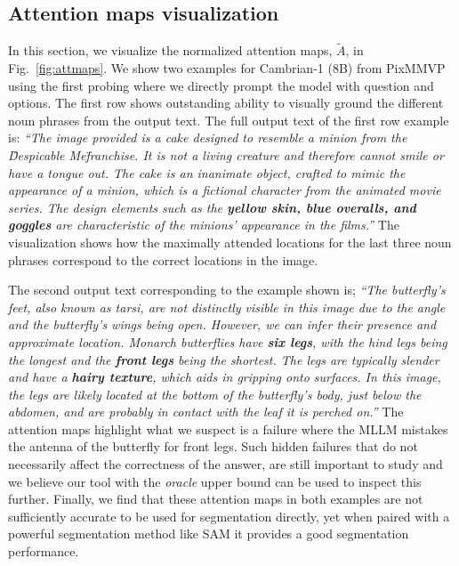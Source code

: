 \subsection{Attention maps visualization}
In this section, we visualize the normalized attention maps, $\tilde{A}$, in Fig.~\ref{fig:attmaps}. We show two examples for Cambrian-1 (8B) from PixMMVP using the first probing where we directly prompt the model with question and options. The first row shows outstanding ability to visually ground the different noun phrases from the output text. The full output text of the first row example is: \textit{``The image provided is a cake designed to resemble a minion from the \"Despicable Me\" franchise. It is not a living creature and therefore cannot smile or have a tongue out. The cake is an inanimate object, crafted to mimic the appearance of a minion, which is a fictional character from the animated movie series. The design elements such as the \textbf{yellow skin, blue overalls, and goggles} are characteristic of the minions' appearance in the films.''} The visualization shows how the maximally attended locations for the last three noun phrases correspond to the correct locations in the image.

The second output text corresponding to the example shown is; \textit{``The butterfly's feet, also known as tarsi, are not distinctly visible in this image  due to the angle and the butterfly's wings being open. However, we can infer their presence and approximate location. Monarch butterflies have \textbf{six legs}, with the hind legs being the longest and the \textbf{front legs} being the shortest. The legs are typically slender and have a \textbf{hairy texture}, which aids in gripping onto surfaces. In this image, the legs are likely located at the bottom of the butterfly's  body, just below the abdomen, and are probably in contact with the leaf it is perched on.''} The attention maps highlight what we suspect is a failure where the MLLM mistakes the antenna of the butterfly for front legs. Such hidden failures that do not necessarily affect the correctness of the answer, are still important to study and we believe our tool with the \textit{oracle} upper bound can be used to inspect this further. Finally, we find that these attention maps in both examples are not sufficiently accurate to be used for segmentation directly, yet when paired with a powerful segmentation method like SAM it provides a good segmentation performance.

